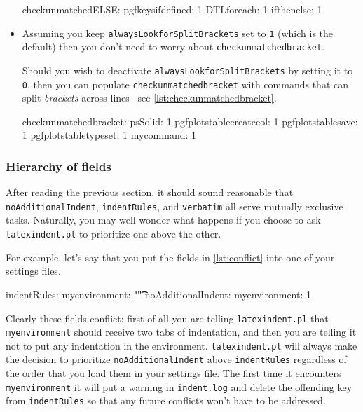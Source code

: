 \begin{itemize}
	\begin{yaml}[caption={\lstinline!checkunmatchedELSE!},label={lst:checkunmatchedELSE}]
checkunmatchedELSE:
    pgfkeysifdefined: 1
    DTLforeach: 1
    ifthenelse: 1
	\end{yaml}
	\item[\color{red}\verbitem{checkunmatchedbracket}] Assuming you keep \lstinline!alwaysLookforSplitBrackets! 
	set to \lstinline!1! (which is the default) then you don't need to worry about \lstinline!checkunmatchedbracket!. 
													 		 		 		 		 					
	Should you wish to deactivate \lstinline!alwaysLookforSplitBrackets! by setting it 
	to \lstinline!0!, then you can populate \lstinline!checkunmatchedbracket! with commands that can 
	split \emph{brackets} across lines-- see \cref{lst:checkunmatchedbracket}.
													 		 		 		 		 					
	\begin{yaml}[caption={\lstinline!checkunmatchedbracket!},label={lst:checkunmatchedbracket}]
checkunmatchedbracket:
    psSolid: 1
    pgfplotstablecreatecol: 1
    pgfplotstablesave: 1
    pgfplotstabletypeset: 1
    mycommand: 1
	\end{yaml}
\end{itemize}
 	 	 	 	 	
\subsubsection{Hierarchy of fields}\label{sec:fieldhierachy}
After reading the previous section, it should sound reasonable that 
\lstinline!noAdditionalIndent!, \lstinline!indentRules!, and 
\lstinline!verbatim! all serve mutually exclusive tasks. Naturally, you may 
well wonder what happens if you choose to ask \lstinline!latexindent.pl! to 
prioritize one above the other.
 	 	 	 	 	
For example, let's say that you put the fields in \cref{lst:conflict} into 
one of your settings files.  
\begin{yaml}[caption={Conflicting ideas},label={lst:conflict}]
indentRules:
   myenvironment: "\t\t"
noAdditionalIndent:
   myenvironment: 1
\end{yaml}
 	 	 	 	 	
Clearly these fields conflict: first of all 
you are telling \lstinline!latexindent.pl! that \lstinline!myenvironment! should 
receive two tabs of indentation, and then you are telling it 
not to put any indentation in the environment. \lstinline!latexindent.pl!
will always make the decision to prioritize \lstinline!noAdditionalIndent! above
\lstinline!indentRules! regardless of the order that you load them in 
your settings file. The first 
time it encounters \lstinline!myenvironment! it will put a warning in \lstinline!indent.log!
and delete the offending key from \lstinline!indentRules! so that any future 
conflicts won't have to be addressed.
 	 	 	 	 	
